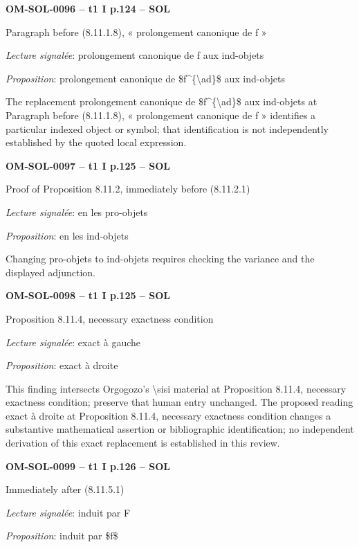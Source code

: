 \par\noindent\textbf{OM-SOL-0096 -- t1 I p.124 -- SOL}\par
Paragraph before (8.11.1.8), « prolongement canonique de f »\par
\emph{Lecture signalée}: prolongement canonique de f aux ind-objets\par
\emph{Proposition}: prolongement canonique de \$f\textasciicircum{}\{\textbackslash{}ad\}\$ aux ind-objets\par
The replacement prolongement canonique de \$f\textasciicircum{}\{\textbackslash{}ad\}\$ aux ind-objets at Paragraph before (8.11.1.8), « prolongement canonique de f » identifies a particular indexed object or symbol; that identification is not independently established by the quoted local expression.\par
\par\noindent\textbf{OM-SOL-0097 -- t1 I p.125 -- SOL}\par
Proof of Proposition 8.11.2, immediately before (8.11.2.1)\par
\emph{Lecture signalée}: en les pro-objets\par
\emph{Proposition}: en les ind-objets\par
Changing pro-objets to ind-objets requires checking the variance and the displayed adjunction.\par
\par\noindent\textbf{OM-SOL-0098 -- t1 I p.125 -- SOL}\par
Proposition 8.11.4, necessary exactness condition\par
\emph{Lecture signalée}: exact à gauche\par
\emph{Proposition}: exact à droite\par
This finding intersects Orgogozo's \textbackslash{}sisi material at Proposition 8.11.4, necessary exactness condition; preserve that human entry unchanged. The proposed reading exact à droite at Proposition 8.11.4, necessary exactness condition changes a substantive mathematical assertion or bibliographic identification; no independent derivation of this exact replacement is established in this review.\par
\par\noindent\textbf{OM-SOL-0099 -- t1 I p.126 -- SOL}\par
Immediately after (8.11.5.1)\par
\emph{Lecture signalée}: induit par F\par
\emph{Proposition}: induit par \$f\$\par
